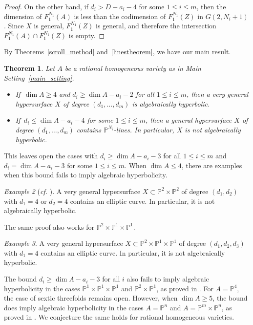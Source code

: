 \documentclass[11pt]{amsart}
\numberwithin{equation}{section}
\newtheorem{theorem}{Theorem}[section]
\theoremstyle{definition}
\theoremstyle{remark}
\newtheorem{example}[theorem]{Example}
\renewcommand{\P}{\mathbb{P}}
\begin{document}
\begin{proof}
    On the other hand, if $d_i > D - a_i - 4$ for some $1\le i\le m$, then the dimension of $F_1^{N_1}(A)$ is less than the codimension of $F_1^{N_1}(Z)$ in $G(2, N_i+1)$. Since $X$ is general, $F_1^{N_1}(Z)$ is general, and therefore the intersection $F_1^{N_1}(A)\cap F_1^{N_1}(Z)$ is empty.
\end{proof}

By Theorems~\ref{scroll_method} and~\ref{linestheorem}, we have our main result.

\begin{theorem}\label{oTeorema}
    Let $A$ be a rational homogeneous variety as in  Main Setting~\ref{main_setting}.
    \begin{itemize}
        \item If\, $\dim A\ge 4$ and $d_i\ge \dim A-a_i-2$ for all $1\le i\le m$, then a very general hypersurface $X$ of degree $(d_1, \hdots, d_m)$ is algebraically hyperbolic.
        \item If\, $d_i\le \dim A - a_i - 4$ for some $1\le i\le m$, then a general hypersurface $X$ of degree $(d_1, \hdots, d_m)$ contains $\P^{N_i}$-lines. In particular, $X$ is not algebraically hyperbolic.
    \end{itemize}
\end{theorem}

This leaves open the cases with $d_i\ge \dim A - a_i - 3$ for all $1\le i\le m$ and $d_i = \dim A-a_i-3$ for some $1\le i\le m$. When $\dim A\le 4$, there are examples when this bound fails to imply algebraic hyperbolicity. 

\begin{example}[\textit{cf.} {\cite[Lemma 4.2]{Y22}}]\label{Example_2_2}
    A very general hypersurface $X\subset \P^2\times \P^2$ of degree $(d_1,d_2)$ with $d_1=4$ or $d_2=4$ contains an elliptic curve. In particular, it is not algebraically hyperbolic.
\end{example}

The same proof also works for $\P^2\times \P^1\times \P^1$.

\begin{example}\label{Example_2_1_1}
    A very general hypersurface $X\subset \P^2\times \P^1\times \P^1$ of degree $(d_1,d_2,d_3)$ with $d_1=4$ contains an elliptic curve. In particular, it is not algebraically hyperbolic.
\end{example}

The bound $d_i\ge \dim A - a_i - 3$ for all $i$ also fails to imply algebraic hyperbolicity in the cases $\P^1\times \P^1\times \P^1$ and $\P^2\times \P^1$, as proved in \cite{CR19}. For $A = \P^4$, the case of sextic threefolds remains open.
%
However, when $\dim A\ge 5$, the bound does imply algebraic hyperbolicity in the cases $A = \P^n$ and $A=\P^m\times \P^n$, as proved in \cite{Y22}. We conjecture the same holds for rational homogeneous varieties.
\end{document}
